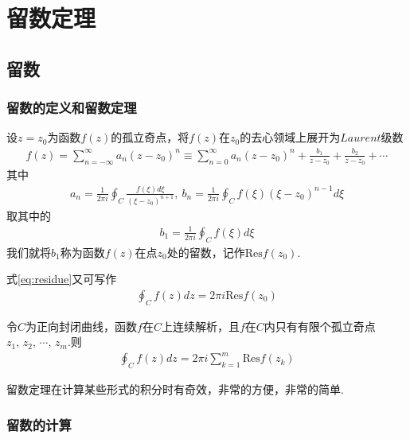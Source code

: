 \chapter{留数定理}
\section{留数}
    \subsection{留数的定义和留数定理}
        设$z=z_0$为函数$f(z)$的孤立奇点，将$f(z)$在$z_0$的去心领域上展开为$Laurent$级数
        \begin{align*}
            f(z)=\sum_{n=-\infty}^{\infty}a_n(z-z_0)^n\equiv \sum_{n=0}^{\infty}a_n(z-z_0)^n + \frac{b_1}{z-z_0}+\frac{b_2}{z-z_0}+\cdots
        \end{align*}
        其中
        \begin{align*}
            a_n=\frac1{2\pi i}\oint_C \frac{f(\xi)d\xi}{(\xi - z_0)^{n+1}},\ b_n=\frac1{2\pi i}\oint_C f(\xi)(\xi - z_0)^{n-1}d\xi
        \end{align*}
        取其中的
        \begin{align}
            \label{eq:residue}
            b_1=\frac1{2\pi i}\oint_C f(\xi)d\xi
        \end{align}
        我们就将$b_1$称为函数$f(z)$在点$z_0$处的留数，记作$\mathrm{Res} f(z_0)$.

        式\ref{eq:residue}又可写作
        \begin{align*}
            \oint_C f(z)dz=2\pi i \mathrm{Res} f(z_0)
        \end{align*}

        \begin{theorem}[留数定理]\label{thm:residue_theorem}
            令$C$为正向封闭曲线，函数$f$在$C$上连续解析，且$f$在$C$内只有有限个孤立奇点$z_1,\,z_2,\,\cdots,\,z_m$.则
            \begin{align*}
                \oint_C f(z)dz=2\pi i\sum_{k=1}^{m}\mathrm{Res}f(z_k)
            \end{align*}
        \end{theorem}

        留数定理在计算某些形式的积分时有奇效，非常的方便，非常的简单.

    \subsection{留数的计算}

